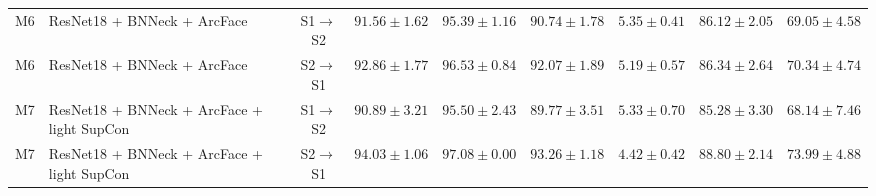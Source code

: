 \begin{table}[t]
{\begin{tabular}{llccccccc}
M6 & ResNet18 + BNNeck + ArcFace & S1$\rightarrow$S2 & $91.56 \pm 1.62$ & $95.39 \pm 1.16$ & $90.74 \pm 1.78$ & $5.35 \pm 0.41$ & $86.12 \pm 2.05$ & $69.05 \pm 4.58$ \\
M6 & ResNet18 + BNNeck + ArcFace & S2$\rightarrow$S1 & $92.86 \pm 1.77$ & $96.53 \pm 0.84$ & $92.07 \pm 1.89$ & $5.19 \pm 0.57$ & $86.34 \pm 2.64$ & $70.34 \pm 4.74$ \\
\midrule
M7 & ResNet18 + BNNeck + ArcFace + light SupCon & S1$\rightarrow$S2 & $90.89 \pm 3.21$ & $95.50 \pm 2.43$ & $89.77 \pm 3.51$ & $5.33 \pm 0.70$ & $85.28 \pm 3.30$ & $68.14 \pm 7.46$ \\
M7 & ResNet18 + BNNeck + ArcFace + light SupCon & S2$\rightarrow$S1 & $94.03 \pm 1.06$ & $97.08 \pm 0.00$ & $93.26 \pm 1.18$ & $4.42 \pm 0.42$ & $88.80 \pm 2.14$ & $73.99 \pm 4.88$ \\
\bottomrule
\end{tabular}%
}
\end{table}
